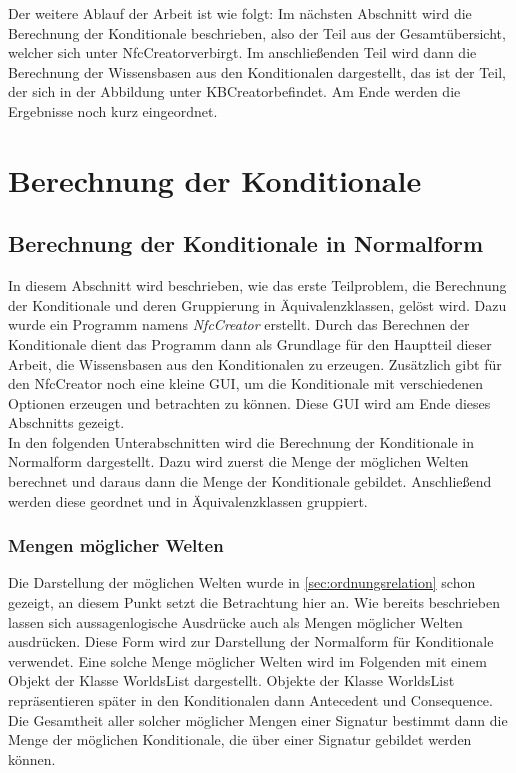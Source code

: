 \documentclass[12pt,a4paper]{article}
\begin{document}
Der weitere Ablauf der Arbeit ist wie folgt: Im nächsten Abschnitt wird die Berechnung der Konditionale beschrieben, also der Teil aus der Gesamtübersicht, welcher sich unter \glqq NfcCreator\grqq \space verbirgt. Im anschließenden Teil wird dann die Berechnung der Wissensbasen aus den Konditionalen dargestellt, das ist der Teil, der sich in der Abbildung unter \glqq KBCreator\grqq \space befindet. Am Ende werden die Ergebnisse noch kurz eingeordnet.

\section{Berechnung der Konditionale}

\subsection{Berechnung der Konditionale in Normalform}

In diesem Abschnitt wird beschrieben, wie das erste Teilproblem, die Berechnung der Konditionale und deren Gruppierung in Äquivalenzklassen, gelöst wird. Dazu wurde ein Programm namens \textit{NfcCreator} erstellt. Durch das Berechnen der Konditionale dient das Programm dann als Grundlage für den Hauptteil dieser Arbeit, die Wissensbasen aus den Konditionalen zu erzeugen. Zusätzlich gibt für den NfcCreator noch eine kleine GUI, um die Konditionale mit verschiedenen Optionen erzeugen und betrachten zu können. Diese GUI wird am Ende dieses Abschnitts gezeigt. \\
In den folgenden Unterabschnitten wird die Berechnung der Konditionale in Normalform dargestellt. Dazu wird zuerst die Menge der möglichen Welten berechnet und daraus dann die Menge der Konditionale gebildet. Anschließend werden diese geordnet und in Äquivalenzklassen gruppiert.


\subsubsection{Mengen möglicher Welten}
\label{sec:worldslist}
Die Darstellung der möglichen Welten wurde in \autoref{sec:ordnungsrelation} schon gezeigt, an diesem Punkt setzt die Betrachtung hier an. Wie bereits beschrieben lassen sich aussagenlogische Ausdrücke auch als Mengen möglicher Welten ausdrücken. Diese Form wird zur Darstellung der Normalform für Konditionale verwendet. Eine solche Menge möglicher Welten wird im Folgenden mit einem Objekt der Klasse WorldsList dargestellt. Objekte der Klasse WorldsList repräsentieren später in den Konditionalen dann Antecedent und Consequence. Die Gesamtheit aller solcher möglicher Mengen einer Signatur bestimmt dann die Menge der möglichen Konditionale, die über einer Signatur gebildet werden können.
\end{document}
